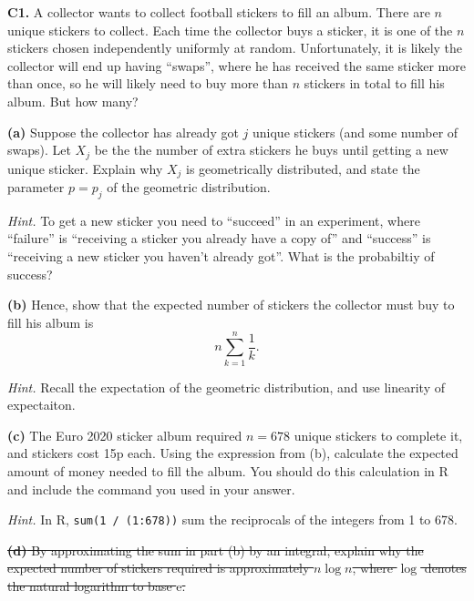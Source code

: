 \documentclass[
  a4paper,
]{book}
\theoremstyle{definition}
\theoremstyle{definition}
\theoremstyle{definition}
\theoremstyle{definition}
\theoremstyle{remark}
\begin{document}
\textbf{C1.} A collector wants to collect football stickers to fill an album. There are \(n\) unique stickers to collect. Each time the collector buys a sticker, it is one of the \(n\) stickers chosen independently uniformly at random. Unfortunately, it is likely the collector will end up having ``swaps'', where he has received the same sticker more than once, so he will likely need to buy more than \(n\) stickers in total to fill his album. But how many?

\textbf{(a)} Suppose the collector has already got \(j\) unique stickers (and some number of swaps). Let \(X_j\) be the the number of extra stickers he buys until getting a new unique sticker. Explain why \(X_j\) is geometrically distributed, and state the parameter \(p = p_j\) of the geometric distribution.

\begin{myanswers}
\emph{Hint.} To get a new sticker you need to ``succeed'' in an experiment, where ``failure'' is ``receiving a sticker you already have a copy of'' and ``success'' is ``receiving a new sticker you haven't already got''. What is the probabiltiy of success?

\end{myanswers}

\textbf{(b)} Hence, show that the expected number of stickers the collector must buy to fill his album is
\[ n \sum_{k=1}^n \frac{1}{k} . \]

\begin{myanswers}
\emph{Hint.} Recall the expectation of the geometric distribution, and use linearity of expectaiton.

\end{myanswers}

\textbf{(c)} The Euro 2020 sticker album required \(n = 678\) unique stickers to complete it, and stickers cost 15p each. Using the expression from (b), calculate the expected amount of money needed to fill the album. You should do this calculation in R and include the command you used in your answer.

\begin{myanswers}
\emph{Hint.} In R, \texttt{sum(1\ /\ (1:678))} sum the reciprocals of the integers from 1 to 678.

\end{myanswers}

\sout{\textbf{(d)} By approximating the sum in part (b) by an integral, explain why the expected number of stickers required is approximately \(n \log n\), where \(\log\) denotes the natural logarithm to base \(\mathrm e\).}
\end{document}
